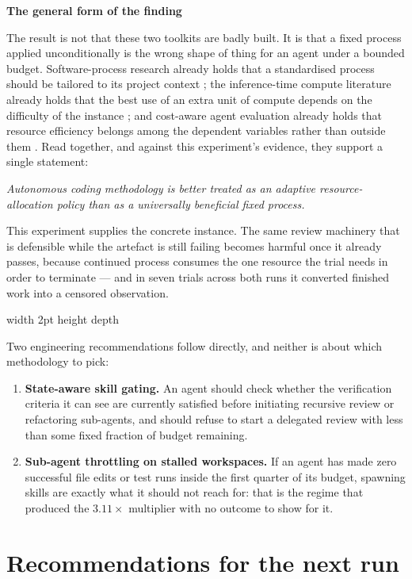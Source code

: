 \documentclass[11pt,a4paper]{article}
\newenvironment{finding}[1]
  {\par\medskip\noindent\begin{lrbox}{\findingbox}%
   \begin{minipage}{\dimexpr\linewidth-2\fboxsep-4pt}%
   \vspace{3pt}\textbf{\color{accent}#1}\par\smallskip\small}
  {\vspace{4pt}\end{minipage}\end{lrbox}%
   \noindent\textcolor{accent}{\vrule width 2pt height \dimexpr\ht\findingbox\relax depth \dimexpr\dp\findingbox\relax}%
   \colorbox{shade}{\usebox{\findingbox}}\par\medskip}
\begin{document}
\begin{finding}{The general form of the finding}
The result is not that these two toolkits are badly built. It is that a fixed process applied
unconditionally is the wrong shape of thing for an agent under a bounded budget.
Software-process research already holds that a standardised process should be tailored to its
project context \citep{xu2007tailoring}; the inference-time compute literature already holds
that the best use of an extra unit of compute depends on the difficulty of the instance
\citep{snell2024scaling}; and cost-aware agent evaluation already holds that resource
efficiency belongs among the dependent variables rather than outside them
\citep{liu2026costbench}. Read together, and against this experiment's evidence, they support
a single statement:

\smallskip
\emph{Autonomous coding methodology is better treated as an adaptive resource-allocation
policy than as a universally beneficial fixed process.}
\smallskip

This experiment supplies the concrete instance. The same review machinery that is defensible
while the artefact is still failing becomes harmful once it already passes, because continued
process consumes the one resource the trial needs in order to terminate --- and in seven
trials across both runs it converted finished work into a censored observation.
\end{finding}

\noindent Two engineering recommendations follow directly, and neither is about which
methodology to pick:

\begin{enumerate}
\item \textbf{State-aware skill gating.} An agent should check whether the verification
      criteria it can see are currently satisfied before initiating recursive review or
      refactoring sub-agents, and should refuse to start a delegated review with less than
      some fixed fraction of budget remaining.
\item \textbf{Sub-agent throttling on stalled workspaces.} If an agent has made zero
      successful file edits or test runs inside the first quarter of its budget, spawning
      skills are exactly what it should not reach for: that is the regime that produced the
      $3.11\times$ multiplier with no outcome to show for it.
\end{enumerate}

\clearpage
\section{Recommendations for the next run}
\label{sec:recommendations}
\end{document}
